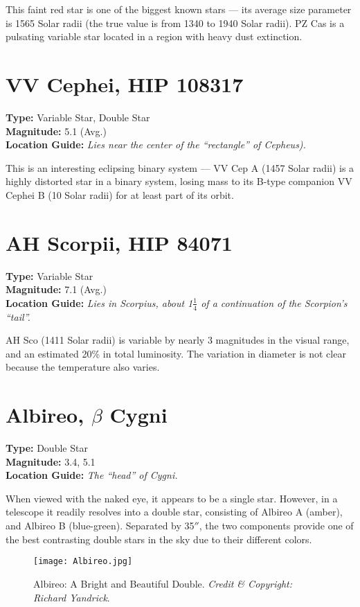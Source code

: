 This faint red star is one of the biggest known stars --- its average
size parameter is 1565 Solar radii (the true value is from 1340 to
1940 Solar radii). PZ Cas is a pulsating variable star located in a
region with heavy dust extinction.


\section{VV Cephei, HIP 108317}
\textbf{Type:} Variable Star, Double Star \\
\textbf{Magnitude:} 5.1 (Avg.) \\
\textbf{Location Guide:} \textit{Lies near the center of the ``rectangle'' of Cepheus).}

This is an interesting eclipsing binary system --- VV Cep A (1457
Solar radii) is a highly distorted star in a binary system, losing
mass to its B-type companion VV Cephei B (10 Solar radii) for at least
part of its orbit.

\section{AH Scorpii, HIP 84071}
\textbf{Type:} Variable Star \\
\textbf{Magnitude:} 7.1 (Avg.) \\
\textbf{Location Guide:} \textit{Lies in Scorpius, about 1$\frac{1}{4}$ of a continuation of the Scorpion's ``tail''.}

AH Sco (1411 Solar radii) is variable by nearly 3 magnitudes in the
visual range, and an estimated 20\% in total luminosity. The variation
in diameter is not clear because the temperature also varies.

\section{Albireo, \texorpdfstring{$\beta$}{beta} Cygni}
\textbf{Type:} Double Star \\
\textbf{Magnitude:} 3.4, 5.1 \\
\textbf{Location Guide:} \textit{The ``head'' of Cygni.}

When viewed with the naked eye, it appears to be a single
star. However, in a telescope it readily resolves into a double star,
consisting of Albireo A (amber), and Albireo B (blue-green). Separated
by 35$''$, the two components provide one of the best contrasting
double stars in the sky due to their different colors.

\begin{figure}[ht]
\texttt{[image: Albireo.jpg]}
\caption{Albireo: A Bright and Beautiful Double. \emph{Credit \& Copyright: Richard Yandrick}.}
\label{fig:Albireo}
\end{figure}

